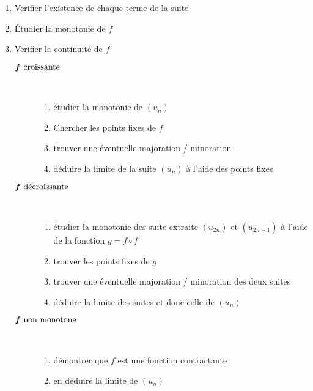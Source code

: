 \begin{enumerate}
    \item Verifier l'existence de chaque terme de la suite
    \item \'Etudier la monotonie de $f$
    \item Verifier la continuité de $f$
    \begin{description}
        \item[$\bs{f \cro}$] \quad \\
        \begin{enumerate}
            \item étudier la monotonie de $(u_n)$
            \item Chercher les points fixes de $f$
            \item trouver une éventuelle majoration / minoration
            \item déduire la limite de la suite $(u_n)$ à l'aide des points
            fixes
        \end{enumerate}
        \item[$\bs{f \dec}$] \quad \\
        \begin{enumerate}
            \item étudier la monotonie des suite extraite $(u_{2n})$ et
            $(u_{2n + 1})$ à l'aide de la fonction $g = f\circ f$
            \item trouver les points fixes de $g$
            \item trouver une éventuelle majoration / minoration des deux
            suites
            \item déduire la limite des suites et donc celle de $(u_n)$
        \end{enumerate}
        \item[$\bs{f \text{ non monotone}}$] \quad \\
        \begin{enumerate}
            \item démontrer que $f$ est une fonction contractante
            \item en déduire la limite de $(u_n)$
        \end{enumerate}
    \end{description}
\end{enumerate}



